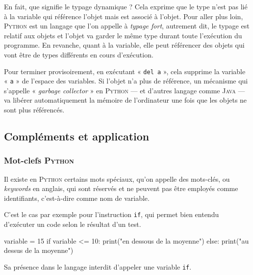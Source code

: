 En fait, que signifie le typage dynamique ? Cela exprime que le type n'est pas lié à la variable qui référence l'objet mais est associé à l'objet.
Pour aller plus loin, \textsc{Python} est un langage que l'on appelle à \emph{typage fort}, autrement dit, le typage est relatif aux objets et l'objet va garder le même type durant toute l'exécution du programme. En revanche, quant à la variable, elle peut référencer des objets qui vont être de types différents en cours d'exécution.

Pour terminer provisoirement, en exécutant « \texttt{del a} », cela supprime la variable « \texttt{a} » de l'espace des variables. Si l'objet n'a plus de référence, un mécanisme qui s'appelle « \textit{garbage collector} » en \textsc{Python} --- et d'autres langage comme \textsc{Java} --- va libérer automatiquement la mémoire de l'ordinateur une fois que les objets ne sont plus référencés.


\subsection[Compléments et application]{Compléments et application}
\label{sub:X.2.2}


\subsubsection[Mot-clefs \textsc{Python}]{Mot-clefs \textsc{Python}}
\label{subsub:X.2.2.1}

Il existe en \textsc{Python} certains mots spéciaux, qu'on appelle des mots-clés, ou \textit{keywords} en anglais, qui sont réservés et ne peuvent pas être employés comme identifiants, c'est-à-dire comme nom de variable.

C'est le cas par exemple pour l'instruction \texttt{if}, qui permet bien entendu d'exécuter un code selon le résultat d'un test.

\begin{nbjupyterin}[before skip=4pt, after skip=6pt]{}
variable = 15
if variable <= 10:
    print("en dessous de la moyenne")
else:
    print("au dessus de la moyenne")
\end{nbjupyterin}


Sa présence dans le langage interdit d'appeler une variable \texttt{if}.

